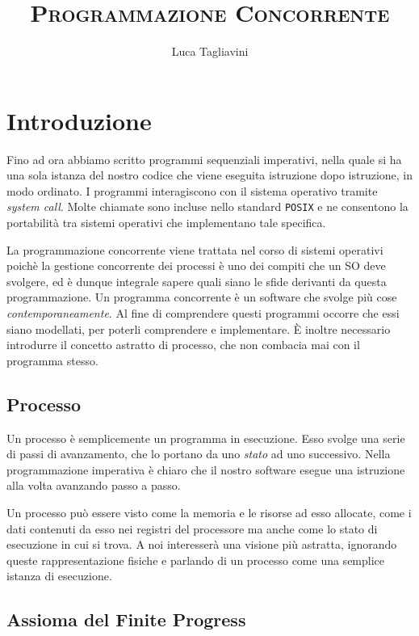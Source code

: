 \documentclass{article}
\title{\textsc{Programmazione Concorrente}}
\author{Luca Tagliavini}
\begin{document}
\maketitle
\tableofcontents
\pagebreak

\section{Introduzione}

Fino ad ora abbiamo scritto programmi sequenziali imperativi, nella
quale si ha una sola istanza del nostro codice che viene eseguita istruzione
dopo istruzione, in modo ordinato.
I programmi interagiscono con il sistema operativo tramite \emph{system call}.
Molte chiamate sono incluse nello standard \verb!POSIX! e ne consentono la
portabilit\`a tra sistemi operativi che implementano tale specifica.

La programmazione concorrente viene trattata nel corso di sistemi operativi poich\`e
la gestione concorrente dei processi \`e uno dei compiti che un SO deve svolgere,
ed \`e dunque integrale sapere quali siano le sfide derivanti da questa programmazione.
Un programma concorrente \`e un software che svolge pi\`u cose \emph{contemporaneamente}.
Al fine di comprendere questi programmi occorre che essi siano modellati, per poterli
comprendere e implementare. \`E inoltre necessario introdurre il concetto astratto di
processo, che non combacia mai con il programma stesso.

\subsection{Processo}

Un processo \`e semplicemente un programma in esecuzione. Esso svolge una serie di
passi di avanzamento, che lo portano da uno \emph{stato} ad uno successivo. Nella
programmazione imperativa \`e chiaro che il nostro software esegue una istruzione
alla volta avanzando passo a passo.

Un processo pu\`o essere visto come la memoria e le risorse ad esso allocate,
come i dati contenuti da esso nei registri del processore ma anche come lo stato
di esecuzione in cui si trova. A noi interesser\`a una visione pi\`u astratta,
ignorando queste rappresentazione fisiche e parlando di un processo come una
semplice istanza di esecuzione.

\subsection{Assioma del Finite Progress}
\end{document}
